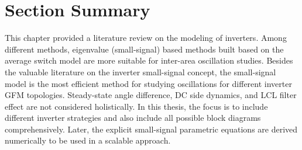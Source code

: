 \section{Section Summary}

This chapter provided a literature review on the modeling of inverters. Among different methods, eigenvalue (small-signal) based methods built based on the average switch model are more suitable for inter-area oscillation studies. Besides the valuable literature on the inverter small-signal concept, the small-signal model is the most efficient method for studying oscillations for different inverter GFM topologies. Steady-state angle difference, DC side dynamics, and LCL filter effect are not considered holistically. In this thesis, the focus is to include different inverter strategies and also include all possible block diagrams comprehensively. Later, the explicit small-signal parametric equations are derived numerically to be used in a scalable approach.


